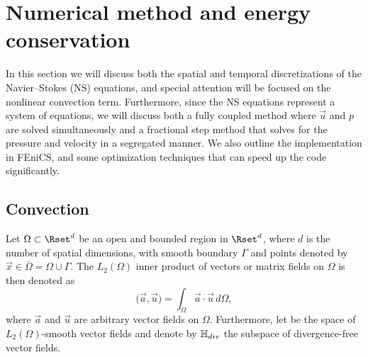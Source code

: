 \section{Numerical method and energy conservation}
\label{sec:mortensen:Numerical}
In this section we will discuss both the spatial and temporal discretizations of the Navier--Stokes (NS) equations, and special attention will be focused on the nonlinear convection term. Furthermore, since the NS equations represent a system of equations, we will discuss both a fully coupled method where $\vec{u}$ and $p$ are solved simultaneously and a fractional step method that solves for the pressure and velocity in a segregated manner. We also outline the implementation in FEniCS, and some optimization techniques that can speed up the code significantly.

\subsection{Convection}
\label{sec:mortensen:Convection}
Let $\Omega \subset \Rset^d$ be an open and bounded region in $\Rset^d$, where $d$ is the number of spatial dimensions, with smooth boundary $\Gamma$ and points denoted by $\vec{x}\in \overline{\Omega}=\Omega \cup \Gamma$. The $L_2(\Omega)$ inner product of vectors or matrix fields on $\Omega$ is then denoted as
\begin{equation}
 \bigl( \vec{a},\vec{u} \bigr) = \int_{\Omega} \vec{a}\cdot \vec{u}\, d\Omega,
 \label{eq:mortensen:L2}
\end{equation}
where $\vec{a}$ and $\vec{u}$ are arbitrary vector fields on $\Omega$. Furthermore, let \Hset be the space of $L_2(\Omega)$-smooth vector fields and denote by $\mathbb{H}_{div}$ the subspace of divergence-free vector fields.

